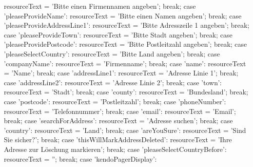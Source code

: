 {{                        resourceText = 'Bitte einen Firmennamen angeben';
                        break;
                    case 'pleaseProvideName':
                        resourceText = 'Bitte einen Namen angeben';
                        break;
                    case 'pleaseProvideAddressLine1':
                        resourceText = 'Bitte Adresszeile 1 angeben';
                        break;
                    case 'pleaseProvideTown':
                        resourceText = 'Bitte Stadt angeben';
                        break;
                    case 'pleaseProvidePostcode':
                        resourceText = 'Bitte Postleitzahl angeben';
                        break;
                    case 'pleaseSelectCountry':
                        resourceText = 'Bitte Land angeben';
                        break;
                    case 'companyName':
                        resourceText = 'Firmenname';
                        break;
                    case 'name':
                        resourceText = 'Name';
                        break;
                    case 'addressLine1':
                        resourceText = 'Adresse Linie 1';
                        break;
                    case 'addressLine2':
                        resourceText = 'Adresse Linie 2';
                        break;
                    case 'town':
                        resourceText = 'Stadt';
                        break;
                    case 'county':
                        resourceText = 'Bundesland';
                        break;
                    case 'postcode':
                        resourceText = 'Postleitzahl';
                        break;
                    case 'phoneNumber':
                        resourceText = 'Telefonnummer';
                        break;
                    case 'email':
                        resourceText = 'Email';
                        break;
                    case 'searchForAddress':
                        resourceText = 'Adresse suchen';
                        break;
                    case 'country':
                        resourceText = 'Land';
                        break;
                    case 'areYouSure':
                        resourceText = 'Sind Sie sicher?';
                        break;
                    case 'thisWillMarkAddressDeleted':
                        resourceText = 'Ihre Adresse zur Löschung markieren';
                        break;
                    case 'pleaseSelectCountryBefore':
                        resourceText = '';
                        break;
                    case 'kendoPagerDisplay':
}}
